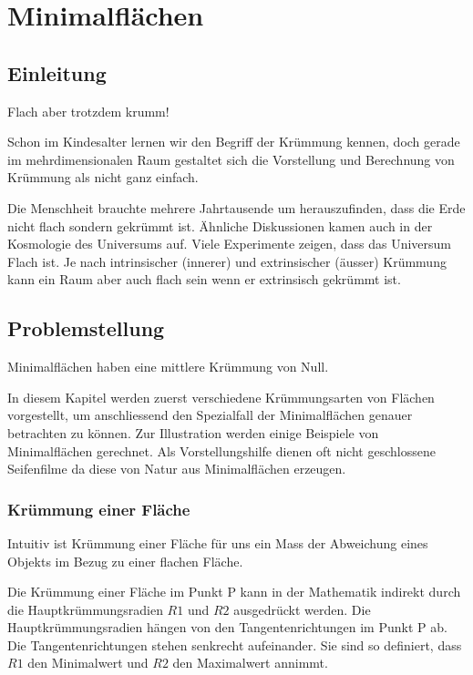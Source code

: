 \chapter{Minimalflächen\label{chapter:thema}}
\begin{refsection}

\section{Einleitung}

Flach aber trotzdem krumm!

Schon im Kindesalter lernen wir den Begriff der Krümmung kennen, doch gerade im mehrdimensionalen Raum gestaltet sich die Vorstellung und Berechnung von Krümmung als nicht ganz einfach. 

Die Menschheit brauchte mehrere Jahrtausende um herauszufinden, dass die Erde nicht flach sondern gekrümmt ist. 
Ähnliche Diskussionen kamen auch in der Kosmologie des Universums auf.
Viele Experimente zeigen, dass das Universum Flach ist. 
Je nach intrinsischer (innerer) und extrinsischer (äusser) Krümmung kann ein Raum aber auch flach sein wenn er extrinsisch gekrümmt ist.


\section{Problemstellung}

Minimalflächen haben eine mittlere Krümmung von Null. 

In diesem Kapitel werden zuerst verschiedene Krümmungsarten von Flächen vorgestellt, um anschliessend den Spezialfall der Minimalflächen genauer betrachten zu können. 
Zur Illustration werden einige Beispiele von Minimalflächen gerechnet. 
Als Vorstellungshilfe dienen oft nicht geschlossene Seifenfilme da diese von Natur aus  Minimalflächen erzeugen.


\subsection{Krümmung einer Fläche}

Intuitiv ist Krümmung einer Fläche für uns ein Mass der Abweichung eines Objekts im Bezug zu einer flachen Fläche. 

Die Krümmung einer Fläche im Punkt P kann in der Mathematik indirekt durch die Hauptkrümmungsradien $R1$ und $R2$ ausgedrückt werden. 
Die Hauptkrümmungsradien hängen von den Tangentenrichtungen im Punkt P ab. 
Die Tangentenrichtungen stehen senkrecht aufeinander.
Sie sind so definiert, dass $R1$ den Minimalwert und $R2$ den Maximalwert annimmt.


\end{refsection}
